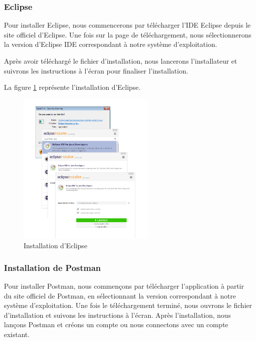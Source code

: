 \documentclass[12pt]{report}
\begin{document}
			\subsubsection{Eclipse}

			\hspace{15pt} Pour installer Eclipse, nous commencerons par télécharger l'IDE Eclipse depuis le site officiel d'Eclipse. Une fois sur la page de téléchargement, nous sélectionnerons la version d'Eclipse IDE correspondant à notre système d'exploitation.

			Après avoir téléchargé le fichier d'installation, nous lancerons l'installateur et suivrons les instructions à l'écran pour finaliser l'installation.

			La figure \ref{fig:eclipseinstall} représente l’installation d'Eclipse.
			
			\begin{figure}[h]
				\centering
				\includegraphics[width=0.6\textwidth]{eclipseinstall.png}
				\caption{Installation d'Eclipse}
				\label{fig:eclipseinstall}
			\end{figure}
			\FloatBarrier


			\subsubsection{Installation de Postman}

			\hspace{15pt} Pour installer Postman, nous commençons par télécharger l'application à partir du site officiel de Postman, en sélectionnant la version correspondant à notre système d'exploitation. Une fois le téléchargement terminé, nous ouvrons le fichier d'installation et suivons les instructions à l'écran. Après l'installation, nous lançons Postman et créons un compte ou nous connectons avec un compte existant.
\end{document}
